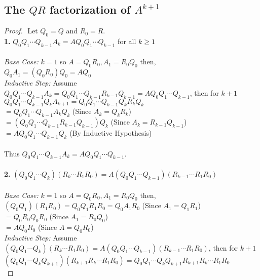 \documentclass[12pt]{article}
\begin{document}
\subsection{The $QR$ factorization of $A^{k+1}$}
\begin{proof}
    $ $\newline
    Let $Q_0 = Q$ and $R_0 = R$. \\
    \textbf{1.} $Q_0 Q_1 \cdots Q_{k-1} A_k = A Q_0 Q_1 \cdots Q_{k-1}$ for all $k \geq 1$ \\ \\
    \textit{Base Case:} $k = 1$ so $A = Q_0 R_0, A_1 = R_0 Q_0$ then, \\
    \indent $Q_0 A_1 = (Q_0 R_0) Q_0 = A Q_0$ \\
    \textit{Inductive Step:} Assume $Q_0 Q_1 \cdots Q_{k-1} A_k = Q_0 Q_1 \cdots Q_{k-1} R_{k-1} Q_{k-1} = A Q_0 Q_1 \cdots Q_{k-1}$, then for $k+1$ \\
    \indent $Q_0 Q_1 \cdots Q_{k-1} Q_k A_{k+1} = Q_0 Q_1 \cdots Q_{k-1} Q_k R_k Q_k$ \\ 
    \indent $= Q_0 Q_1 \cdots Q_{k-1} A_k Q_k$ (Since $A_k = Q_k R_k$) \\
    \indent $= (Q_0 Q_1 \cdots Q_{k-1} R_{k-1} Q_{k-1}) Q_k$ (Since $A_k = R_{k-1} Q_{k-1}$) \\
    \indent $= A Q_0 Q_1 \cdots Q_{k-1} Q_k$ (By Inductive Hypothesis)\\ \\
    Thus $Q_0 Q_1 \cdots Q_{k-1} A_{k} = A Q_0 Q_1 \cdots Q_{k-1}$. \\ \\
    \textbf{2.} $(Q_0 Q_1 \cdots Q_k)(R_k \cdots R_1 R_0) = A(Q_0 Q_1 \cdots Q_{k-1})(R_{k-1} \cdots R_1 R_0)$ \\ \\
    \textit{Base Case:} $k = 1$ so $A = Q_0 R_0, A_1 = R_0 Q_0$ then, \\
    \indent $(Q_0 Q_1)(R_1 R_0) = Q_0 Q_1 R_1 R_0 = Q_0 A_1 R_0$ (Since $A_1 = Q_1 R_1$) \\
    \indent $= Q_0 R_0 Q_0 R_0$ (Since $A_1 = R_0 Q_0$) \\ 
    \indent $= A Q_0 R_0$ (Since $A = Q_0 R_0$) \\
    \textit{Inductive Step:} Assume $(Q_0 Q_1 \cdots Q_k)(R_k \cdots R_1 R_0) = A(Q_0 Q_1 \cdots Q_{k-1})(R_{k-1} \cdots R_1 R_0)$, then for $k+1$ \\
    \indent $(Q_0 Q_1 \cdots Q_k Q_{k+1})(R_{k+1} R_k \cdots R_1 R_0) = Q_0 Q_1 \cdots Q_k Q_{k+1}R_{k+1} R_k \cdots R_1 R_0$ \\

\end{proof}
\end{document}
